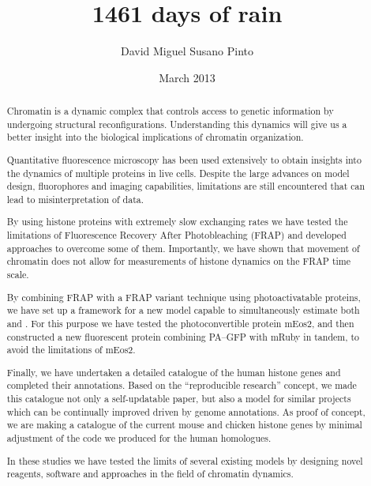 \documentclass[a4paper,twoside,openright,draft]{memoir}
\author{David Miguel Susano Pinto}
\date{March 2013} %
\title{1461 days of rain} %
\begin{document}
  \frontmatter

  \maketitle

  \dedication{The leprechaun made me do it.}

  \clearpage
  \tableofcontents
  \clearpage
  \listoffigures
  \clearpage
  \listoftables

  \clearpage
  \begin{abstract}  %

    Chromatin is a dynamic complex that controls access to genetic information by
    undergoing structural reconfigurations. Understanding this dynamics will give
    us a better insight into the biological implications of chromatin organization.

    Quantitative fluorescence microscopy has been used extensively to obtain insights
    into the dynamics of multiple proteins in live cells. Despite the large advances on
    model design, fluorophores and imaging capabilities, limitations are still
    encountered that can lead to misinterpretation of data.

    By using histone proteins with extremely slow exchanging rates we have tested the
    limitations of Fluorescence Recovery After Photobleaching (FRAP) and developed
    approaches to overcome some of them. Importantly, we have shown that movement of
    chromatin does not allow for measurements of histone dynamics on the FRAP time scale.

    By combining FRAP with a FRAP variant technique using photoactivatable proteins, we have
    set up a framework for a new model capable to simultaneously estimate both \Kon{}
    and \Koff{}. For this purpose we have tested the photoconvertible protein mEos2,
    and then constructed a new fluorescent protein combining PA--GFP with mRuby in tandem,
    to avoid the limitations of mEos2.

    Finally, we have undertaken a detailed catalogue of the human histone genes and completed
    their annotations. Based on the ``reproducible research'' concept, we made this
    catalogue not only a self-updatable paper, but also a model for similar projects
    which can be continually improved driven by genome annotations. As proof of concept, we
    are making a catalogue of the current mouse and chicken histone genes by minimal
    adjustment of the code we produced for the human homologues.

    In these studies we have tested the limits of several existing models by designing
    novel reagents, software and approaches in the field of chromatin dynamics.

  \end{abstract}
\end{document}
